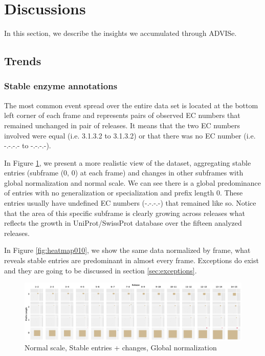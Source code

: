 \section{Discussions}
\label{sec:discussion}

In this section, we describe the insights we accumulated through ADVISe.

\subsection{Trends}

\subsubsection{Stable enzyme annotations}

The most common event spread over the entire data set is located at the bottom left corner of each frame and represents pairs of observed EC numbers that remained unchanged in pair of releases. It means that the two EC numbers involved were equal (i.e. 3.1.3.2 to 3.1.3.2) or that there was no EC number (i.e. -.-.-.- to -.-.-.-). 

In Figure \ref{fig:heatmap011}, we present a more realistic view of the dataset, aggregating stable entries (subframe (0, 0) at each frame) and changes in other subframes with global normalization and normal scale. We can see there is a global predominance of entries with no generalization or specialization and prefix length 0. These entries usually have undefined EC numbers (-.-.-.-) that remained like so. Notice that the area of this specific subframe is clearly growing across releases what reflects the growth in UniProt/SwissProt database over the fifteen analyzed releases.

In Figure \ref{fig:heatmap010}, we show the same data normalized by frame, what reveals stable entries are predominant in almost every frame. Exceptions do exist and they are going to be discussed in section \ref{sec:exceptions}.

\begin{figure}[htb]
  \centering
  \includegraphics[width=17cm]{images/squaremap011.png}
  \caption{Normal scale, Stable entries + changes, Global normalization}
  \label{fig:heatmap011}
\end{figure}

